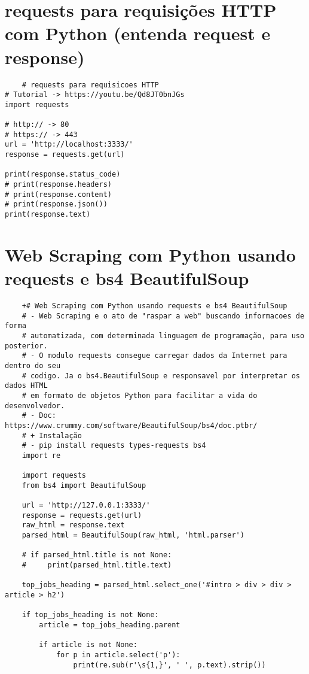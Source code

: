 \documentclass{article}
\begin{document}
\section{requests para requisições HTTP com Python (entenda request e response)}
\begin{lstlisting}
    # requests para requisicoes HTTP
# Tutorial -> https://youtu.be/Qd8JT0bnJGs
import requests

# http:// -> 80
# https:// -> 443
url = 'http://localhost:3333/'
response = requests.get(url)

print(response.status_code)
# print(response.headers)
# print(response.content)
# print(response.json())
print(response.text)
\end{lstlisting}




\section{Web Scraping com Python usando requests e bs4 BeautifulSoup}
\begin{lstlisting}
    +# Web Scraping com Python usando requests e bs4 BeautifulSoup
    # - Web Scraping e o ato de "raspar a web" buscando informacoes de forma
    # automatizada, com determinada linguagem de programação, para uso posterior.
    # - O modulo requests consegue carregar dados da Internet para dentro do seu
    # codigo. Ja o bs4.BeautifulSoup e responsavel por interpretar os dados HTML
    # em formato de objetos Python para facilitar a vida do desenvolvedor.
    # - Doc: https://www.crummy.com/software/BeautifulSoup/bs4/doc.ptbr/
    # + Instalação
    # - pip install requests types-requests bs4
    import re
    
    import requests
    from bs4 import BeautifulSoup
    
    url = 'http://127.0.0.1:3333/'
    response = requests.get(url)
    raw_html = response.text
    parsed_html = BeautifulSoup(raw_html, 'html.parser')
    
    # if parsed_html.title is not None:
    #     print(parsed_html.title.text)
    
    top_jobs_heading = parsed_html.select_one('#intro > div > div > article > h2')
    
    if top_jobs_heading is not None:
        article = top_jobs_heading.parent
    
        if article is not None:
            for p in article.select('p'):
                print(re.sub(r'\s{1,}', ' ', p.text).strip())
\end{lstlisting}
\end{document}
